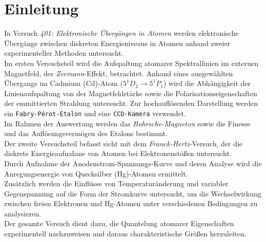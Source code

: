 \chapter{Einleitung}
In Versuch \textit{401: Elektronische Übergängen in Atomen} werden elektronische Übergänge zwischen diskreten Energieniveaus in Atomen anhand zweier experimenteller
Methoden untersucht.
\vspace{0.3cm}\\
Im ersten Versuchsteil wird die Aufspaltung atomarer Spektrallinien im externen Magnetfeld, der \textit{Zeemann}-Effekt, betrachtet. Anhand eines ausgewählten
Übergangs im Cadmium (Cd)-Atom ($5^1D_2 \rightarrow 5^1P_1$) wird die Abhängigkeit der Linienaufspaltung von der Magnetfeldstärke sowie die Polarisationseigenschaften der 
emmittierten Strahlung untersucht. Zur hochauflösenden Darstellung werden ein \texttt{Fabry-Pérot-Etalon} und eine \texttt{CCD-Kamera} verwendet.\\
Im Rahmen der Auswertung werden das \textit{Bohrsche-Magneton} sowie die Finesse und das Auflösungsvermögen des Etalons bestimmt.
\vspace{0.3cm}\\
Der zweite Versuchsteil befasst sicht mit dem  \textit{Franck-Hertz}-Versuch, der die diskrete Energieaufnahme von Atomen bei Elektronenstößen untersucht.\\
Durch Aufnahme der Anodenstrom-Spannungs-Kurve und deren Analyse wird die Anregungsenergie von Quecksilber (Hg)-Atomen ermittelt.\\
Zusätzlich werden die Einflüsse von Temperaturänderung und variabler Gegenspannung auf die Form der Stromkurve untersucht, um die Wechselwirkung zwischen freien Elektronen und Hg-Atomen
unter verschiedenen Bedingungen zu analysieren.
\vspace{0.3cm}\\
Der gesamte Versuch dient dazu, die Quantelung atomarer Eigenschaften experimentell nachzuweisen und daraus charakteristische Größen herzuleiten.